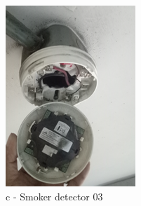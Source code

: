 \begin{figure}[!h]
\begin{minipage}[b]{0.22\linewidth}
		\includegraphics[width=\textwidth]{figures/ch05_fdas_sd03}
		\caption*{c - Smoker detector 03}
	\end{minipage}
	\hspace{0.03cm}
	\begin{minipage}[b]{0.22\linewidth}
		\centering

\end{minipage}
\end{figure}
